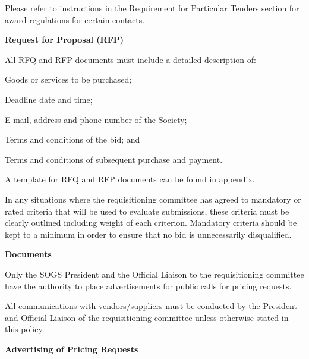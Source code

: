 \begin{longenum}[label*=\thesection.\arabic*., align=left]
\begin{longenum} [label*=\arabic*., align=left]
	\item 	Please refer to instructions in the Requirement for Particular Tenders section for award regulations for certain contacts.
\end{longenum}

\item \textbf{Request for Proposal (RFP)}

\begin{longenum} [label*=\arabic*., align=left]
		\item All RFQ and RFP documents must include a detailed description of:
	\begin{longenum} [label*=\arabic*., align=left]	
		\item Goods or services to be purchased; 
	\item 	Deadline date and time;
	\item	E-mail, address and phone number of the Society; 
	\item 	Terms and conditions of the bid; and
	\item 	Terms and conditions of subsequent purchase and payment.
		
	\item 	A template for RFQ and RFP documents can be found in appendix.
		
	\item	In any situations where the requisitioning committee has agreed to mandatory or rated criteria that will be used to evaluate submissions, these criteria must be clearly outlined including weight of each criterion. Mandatory criteria should be kept to a minimum in order to ensure that no bid is unnecessarily disqualified. 
\end{longenum}
\end{longenum}
\item \textbf{Documents}

\begin{longenum} [label*=\arabic*., align=left]
		\item Only the SOGS President and the Official Liaison to the requisitioning committee have the authority to place advertisements for public calls for pricing requests. 
		
		\item All communications with vendors/suppliers must be conducted by the President and Official Liaison of the requisitioning committee unless otherwise stated in this policy.
\end{longenum}

\item \textbf{Advertising of Pricing Requests}


\end{longenum}
